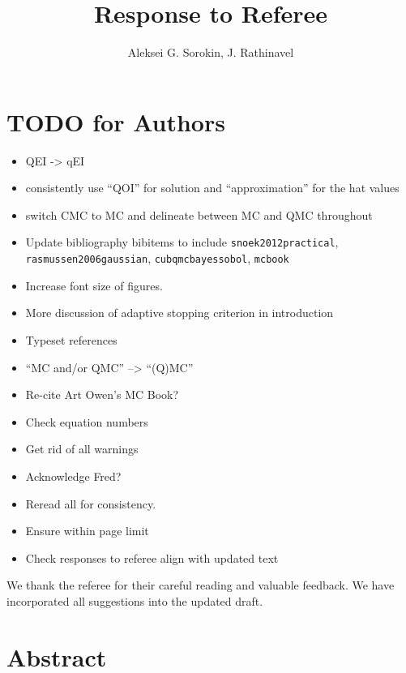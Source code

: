 \documentclass{article}[12pt]
\title{Response to Referee}
\author{Aleksei G. Sorokin, J. Rathinavel}
\date{}
\newcommand{\MISCComment}[1]{{\color{purple} #1}}
\begin{document}
\maketitle    

\MISCComment{
    \section*{TODO for Authors}
    \begin{itemize}
        \item QEI -> qEI
        \item consistently use ``QOI'' for solution and ``approximation'' for the hat values
        \item switch CMC to MC and delineate between MC and QMC throughout
        \item Update bibliography bibitems to include \texttt{snoek2012practical}, \texttt{rasmussen2006gaussian}, \texttt{cubqmcbayessobol}, \texttt{mcbook}
        \item Increase font size of figures. 
        \item More discussion of adaptive stopping criterion in introduction
        \item Typeset references 
        \item ``MC and/or QMC'' --> ``(Q)MC''
        \item Re-cite Art Owen's MC Book? 
        \item Check equation numbers
        \item Get rid of all warnings 
        \item Acknowledge Fred?
        \item Reread all for consistency.
        \item Ensure within page limit
        \item Check responses to referee align with updated text
    \end{itemize}}

We thank the referee for their careful reading and valuable feedback. We have incorporated all suggestions into the updated draft. 

\section*{Abstract}
\end{document}
